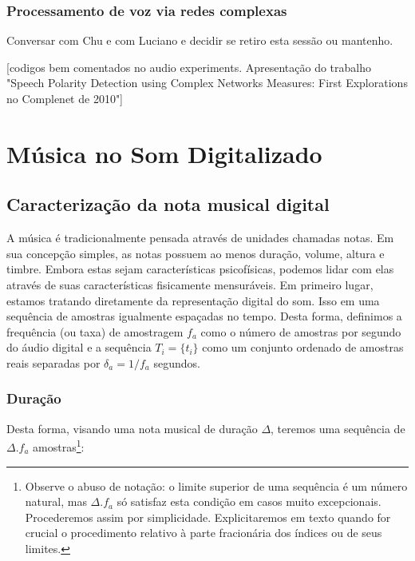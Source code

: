       \subsubsection{Processamento de voz via redes complexas}
Conversar com Chu e com Luciano e decidir se retiro esta sessão ou mantenho.

      [codigos bem comentados no audio experiments. Apresentação do trabalho "Speech Polarity Detection using Complex Networks Measures: First Explorations no Complenet de 2010"]



\section{Música no Som Digitalizado}

\subsection{Caracterização da nota musical digital}
A música é tradicionalmente pensada através de unidades chamadas notas. Em sua concepção
simples, as notas possuem ao menos duração, volume, altura e timbre. Embora estas
sejam características psicofísicas, podemos lidar com elas através de suas características
fisicamente mensuráveis.
Em primeiro lugar, estamos tratando diretamente da representação digital do som. Isso em uma
sequência de amostras igualmente espaçadas no tempo. Desta forma, definimos a
frequência (ou taxa) de amostragem $f_a$ como o número de amostras por segundo do áudio digital e
a sequência $T_i=\{t_i\}$ como um conjunto ordenado de amostras reais separadas por $\delta_a=1/f_a$ segundos.


\subsubsection{Duração}
Desta forma, visando uma nota musical de duração $\Delta$,
teremos uma sequência de $ \Delta . f_a $ amostras\footnote{Observe o abuso de notação:
o limite superior de uma sequência é um número natural, mas $ \Delta . f_a $
só satisfaz esta condição em casos muito excepcionais. Procederemos assim por simplicidade. 
Explicitaremos em texto quando for crucial o procedimento relativo à parte fracionária dos índices
ou de seus limites.}:


